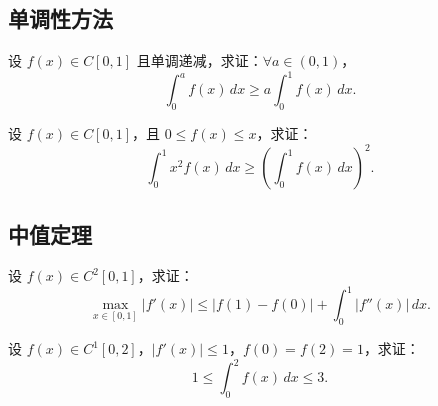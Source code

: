 \documentclass[lang=cn,10pt,thmcnt=section]{elegantbook}
\begin{document}
\subsection{单调性方法}
\begin{example}
	设 \( f(x) \in C[0,1] \) 且单调递减，求证：\(\forall a \in (0,1)\)，
\[
\int_0^a f(x) \, dx \geq a \int_0^1 f(x) \, dx.
\]
\end{example}
\begin{example}
	设 \( f(x) \in C[0,1] \)，且 \( 0 \leq f(x) \leq x \)，求证：
\[
\int_0^1 x^2 f(x) \, dx \geq \left( \int_0^1 f(x) \, dx \right)^2.
\]
\end{example}
\subsection{中值定理}
\begin{example}
	设 \( f(x) \in C^2[0,1] \)，求证：
\[
\max_{x \in [0,1]} |f'(x)| \leq |f(1) - f(0)| + \int_0^1 |f''(x)| \, dx.
\]
\end{example}
\begin{example}
	设 \( f(x) \in C^1[0,2] \)，\(|f'(x)| \leq 1\)，\( f(0) = f(2) = 1 \)，求证：
\[
1 \leq \int_0^2 f(x) \, dx \leq 3.
\]
\end{example}
\end{document}

